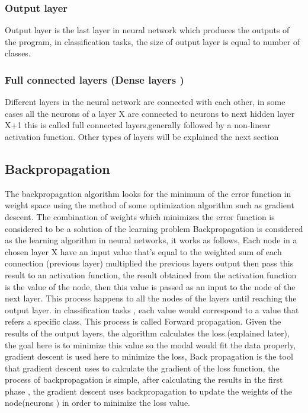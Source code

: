 \subsubsection{Output layer}
Output layer is the last layer in neural network which produces the outputs of the
program, in classification tasks, the size of output layer is equal to number of classes.
\subsubsection{Full connected layers (Dense layers )}
Different layers in the neural network are connected with each other, in some cases
all the neurons of a layer X are connected to neurons to next hidden layer X+1 this is
called full connected layers,generally followed by a non-linear activation function.
Other types of layers will be explained the next section
\subsection{Backpropagation}
The backpropagation algorithm looks for the minimum of the error function in weight
space using the method of some optimization algorithm such as gradient descent. The
combination of weights which minimizes the error function is considered to be a solution
of the learning problem \cite{art21} Backpropagation is considered as the learning algorithm
in neural networks, it works as follows, Each node in a chosen layer X have an input
value that’s equal to the weighted sum of each connection (previous layer) multiplied the
previous layers output then pass this result to an activation function, the result obtained
from the activation function is the value of the node, then this value is passed as an input
to the node of the next layer. This process happens to all the nodes of the layers until
reaching the output layer. in classification tasks , each value would correspond to a value
that refers a specific class. This process is called Forward propagation. Given the results
of the output layers, the algorithm calculates the loss.(explained later), the goal here is
to minimize this value so the modal would fit the data properly, gradient descent is used
here to minimize the loss, Back propagation is the tool that gradient descent uses to
calculate the gradient of the loss function, the process of backpropagation is simple, after
calculating the results in the first phase , the gradient descent uses backpropagation to
update the weights of the node(neurons ) in order to minimize the loss value. \cite{art20}
